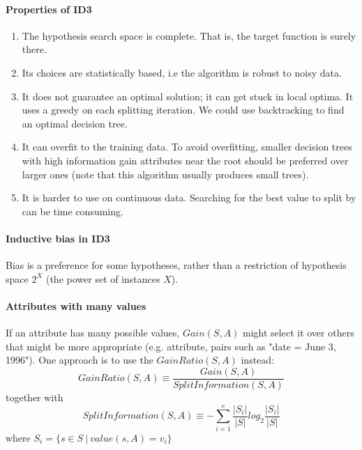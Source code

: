 \paragraph{Properties of ID3}
\begin{enumerate}
    \item The hypothesis search space is complete. That is, the target function is surely there.
    \item Its choices are statistically based, i.e the algorithm is robust to noisy data.
    \item It does not guarantee an optimal solution; it can get stuck in local optima. It uses a greedy on each splitting iteration. We could use backtracking to find an optimal decision tree. 
    \item It can overfit to the training data. To avoid overfitting, smaller decision trees with high information gain attributes near the root should be preferred over larger ones (note that this algorithm usually produces small trees).
    \item It is harder to use on continuous data. Searching for the best value to split by can be time consuming.
\end{enumerate}
\paragraph{Inductive bias in ID3} Bias is a preference for some hypotheses, rather than a restriction of hypothesis space $2^X$ (the power set of instances $X$).
\paragraph{Attributes with many values} If an attribute has many possible values, $Gain(S, A)$ might select it over others that might be more appropriate (e.g. attribute, pairs such as "date = June 3, 1996"). One approach is to use the $GainRatio(S, A)$ instead: 
\begin{equation*}
    GainRatio(S, A) \equiv \frac{Gain(S, A)}{SplitInformation(S, A)}
\end{equation*}
together with
\begin{equation*}
    SplitInformation(S, A) \equiv -\sum_{i =1}^{c} \frac{|S_i|}{|S|} log_2 \frac{|S_i|}{|S|}    
\end{equation*}
where $S_i = \{ s \in S ~|~ value(s, A) = v_i \} $

